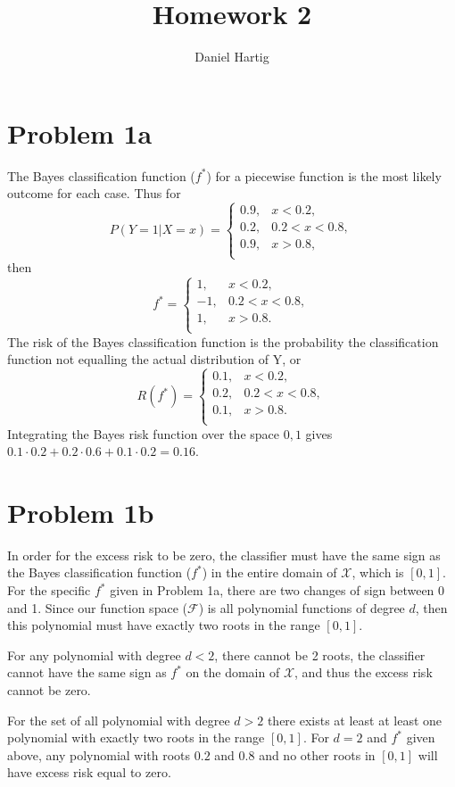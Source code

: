\documentclass{article}
\title{Homework 2}
\author{Daniel Hartig}
\begin{document}
\maketitle

\section*{Problem 1a}

The Bayes classification function ($f^*$) for a piecewise function is the most likely outcome for each case. Thus for
$$ P(Y = 1|X = x) = \begin{cases} 
0.9,& x < 0.2, \\
0.2,& 0.2 < x < 0.8,\\
0.9,& x > 0.8,\\ \end{cases} $$ then
$$ f^* = \begin{cases} 
1,& x < 0.2, \\
-1,& 0.2 < x < 0.8,\\
1,& x > 0.8.\\ \end{cases} $$ The risk of the Bayes classification function is the probability the classification function not equalling the actual distribution of Y, or
$$ R(f^*) = \begin{cases} 
0.1,& x < 0.2, \\
0.2,& 0.2 < x < 0.8,\\
0.1,& x > 0.8.\\ \end{cases} $$
Integrating the Bayes risk function over the space ${0, 1}$ gives $0.1\cdot0.2 + 0.2\cdot0.6+0.1\cdot0.2 = 0.16$.

\section*{Problem 1b}

In order for the excess risk to be zero, the classifier must have the same sign as the Bayes classification function ($f^*$) in the entire domain of $\mathcal{X}$, which is $[0, 1]$. For the specific $f^*$ given in Problem 1a, there are two changes of sign between 0 and 1. Since our function space ($\mathcal{F}$) is all polynomial functions of degree $d$, then this polynomial must have exactly two roots in the range $[0, 1]$.

For any polynomial with degree $d < 2$, there cannot be 2 roots, the classifier cannot have the same sign as $f^*$ on the domain of $\mathcal{X}$, and thus the excess risk cannot be zero.

For the set of all polynomial with degree $d >2$ there exists at least at least one polynomial with exactly two roots in the range $[0, 1]$. For $d=2$ and $f^*$ given above, any polynomial with roots $0.2$ and $0.8$ and no other roots in $[0, 1]$ will have excess risk equal to zero.
\end{document}
